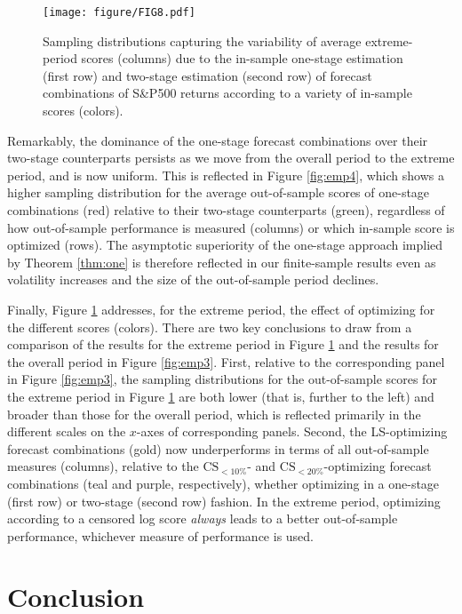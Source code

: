\documentclass[12pt]{article}
\theoremstyle{definition}
\theoremstyle{remark}
\begin{document}
\begin{figure}[t]
\texttt{[image: figure/FIG8.pdf]}
\caption{Sampling distributions capturing the variability of average extreme-period scores (columns) due to the in-sample one-stage estimation (first row) and two-stage estimation (second row) of forecast combinations of S\&P500 returns according to a variety of in-sample scores (colors).}
\label{fig:emp5}
\end{figure}

Remarkably, the dominance of the one-stage forecast combinations over their two-stage counterparts persists as we move from the overall period to the extreme period, and is now uniform. This is reflected in Figure \ref{fig:emp4}, which shows a higher sampling distribution for the average out-of-sample scores of one-stage combinations (red) relative to their two-stage counterparts (green), regardless of how out-of-sample performance is measured (columns) or which in-sample score is optimized (rows). The asymptotic superiority of the one-stage approach implied by Theorem \ref{thm:one} is therefore reflected in our finite-sample results even as volatility increases and the size of the out-of-sample period declines.

Finally, Figure \ref{fig:emp5} addresses, for the extreme period, the effect of optimizing for the different scores (colors). There are two key conclusions to draw from a comparison of the results for the extreme period in Figure \ref{fig:emp5} and the results for the overall period in Figure \ref{fig:emp3}. First, relative to the corresponding panel in Figure \ref{fig:emp3}, the sampling distributions for the out-of-sample scores for the extreme period in Figure \ref{fig:emp5} are both lower (that is, further to the left) and broader than those for the overall period, which is reflected primarily in the different scales on the $x$-axes of corresponding panels. Second, the LS-optimizing forecast combinations (gold) now underperforms in terms of all out-of-sample measures (columns), relative to the $\mathrm{CS}_{<10\%}$- and $\mathrm{CS}_{<20\%}$-optimizing forecast combinations (teal and purple, respectively), whether optimizing in a one-stage (first row) or two-stage (second row) fashion. In the extreme period, optimizing according to a censored log score \textit{always} leads to a better out-of-sample performance, whichever measure of performance is used.

\section{Conclusion\label{sec:conclusion}}
\end{document}
